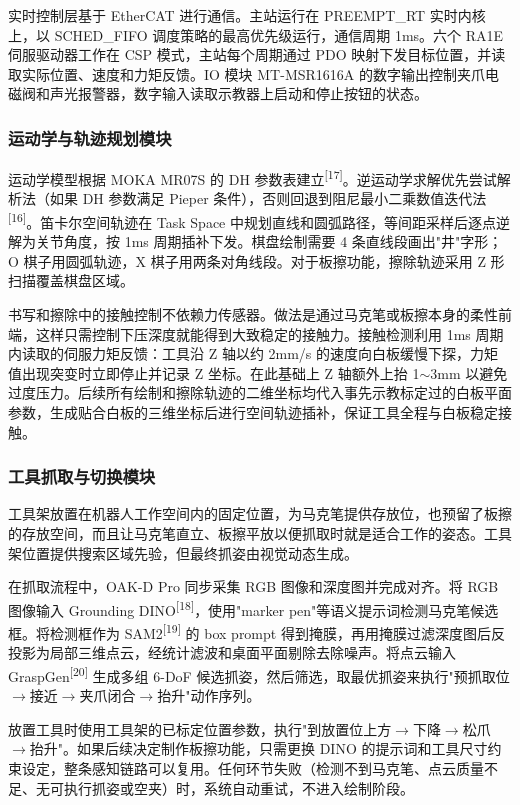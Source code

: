 \documentclass[a4paper, 12pt, oneside]{ctexart}
\newcommand{\supercite}[1]{\textsuperscript{[#1]}}
\begin{document}
实时控制层基于 EtherCAT 进行通信。主站运行在 PREEMPT\_RT 实时内核上，以 SCHED\_FIFO 调度策略的最高优先级运行，通信周期 1ms。六个 RA1E 伺服驱动器工作在 CSP 模式，主站每个周期通过 PDO 映射下发目标位置，并读取实际位置、速度和力矩反馈。IO 模块 MT-MSR1616A 的数字输出控制夹爪电磁阀和声光报警器，数字输入读取示教器上启动和停止按钮的状态。

\subsubsection*{运动学与轨迹规划模块}

运动学模型根据 MOKA MR07S 的 DH 参数表建立\supercite{17}。逆运动学求解优先尝试解析法（如果 DH 参数满足 Pieper 条件），否则回退到阻尼最小二乘数值迭代法\supercite{16}。笛卡尔空间轨迹在 Task Space 中规划直线和圆弧路径，等间距采样后逐点逆解为关节角度，按 1ms 周期插补下发。棋盘绘制需要 4 条直线段画出"井"字形；O 棋子用圆弧轨迹，X 棋子用两条对角线段。对于板擦功能，擦除轨迹采用 Z 形扫描覆盖棋盘区域。

书写和擦除中的接触控制不依赖力传感器。做法是通过马克笔或板擦本身的柔性前端，这样只需控制下压深度就能得到大致稳定的接触力。接触检测利用 1ms 周期内读取的伺服力矩反馈：工具沿 Z 轴以约 2mm/s 的速度向白板缓慢下探，力矩值出现突变时立即停止并记录 Z 坐标。在此基础上 Z 轴额外上抬 1$\sim$3mm 以避免过度压力。后续所有绘制和擦除轨迹的二维坐标均代入事先示教标定过的白板平面参数，生成贴合白板的三维坐标后进行空间轨迹插补，保证工具全程与白板稳定接触。

\subsubsection*{工具抓取与切换模块}

工具架放置在机器人工作空间内的固定位置，为马克笔提供存放位，也预留了板擦的存放空间，而且让马克笔直立、板擦平放以便抓取时就是适合工作的姿态。工具架位置提供搜索区域先验，但最终抓姿由视觉动态生成。

在抓取流程中，OAK-D Pro 同步采集 RGB 图像和深度图并完成对齐。将 RGB 图像输入 Grounding DINO\supercite{18}，使用"marker pen"等语义提示词检测马克笔候选框。将检测框作为 SAM2\supercite{19} 的 box prompt 得到掩膜，再用掩膜过滤深度图后反投影为局部三维点云，经统计滤波和桌面平面剔除去除噪声。将点云输入 GraspGen\supercite{20} 生成多组 6-DoF 候选抓姿，然后筛选，取最优抓姿来执行"预抓取位$\to$接近$\to$夹爪闭合$\to$抬升"动作序列。

放置工具时使用工具架的已标定位置参数，执行"到放置位上方$\to$下降$\to$松爪$\to$抬升"。如果后续决定制作板擦功能，只需更换 DINO 的提示词和工具尺寸约束设定，整条感知链路可以复用。任何环节失败（检测不到马克笔、点云质量不足、无可执行抓姿或空夹）时，系统自动重试，不进入绘制阶段。
\end{document}
